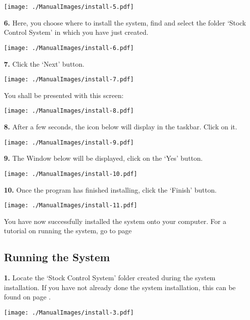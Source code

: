 \texttt{[image: ./ManualImages/install-5.pdf]}

\pagebreak

\textbf{6.} Here, you choose where to install the system, find and select the folder `Stock Control System' in which you have just created.

\texttt{[image: ./ManualImages/install-6.pdf]}

\pagebreak

\textbf{7.} Click the `Next' button.

\texttt{[image: ./ManualImages/install-7.pdf]}

\pagebreak

You shall be presented with this screen:

\texttt{[image: ./ManualImages/install-8.pdf]}

\pagebreak

\textbf{8.} After a few seconds, the icon below will display in the taskbar. Click on it.

\texttt{[image: ./ManualImages/install-9.pdf]}

\pagebreak

\textbf{9.} The Window below will be displayed, click on the `Yes' button.

\texttt{[image: ./ManualImages/install-10.pdf]}

\pagebreak

\textbf{10.} Once the program has finished installing, click the `Finish' button.

\texttt{[image: ./ManualImages/install-11.pdf]}

You have now successfully installed the system onto your computer. For a tutorial on running the system, go to page \pageref{fig:Running the System}

\pagebreak

\subsection{Running the System}
\label{fig:Running the System}

\textbf{1.} Locate the `Stock Control System' folder created during the system installation. If you have not already done the system installation, this can be found on page \pageref{fig:System Installation}.

\texttt{[image: ./ManualImages/install-3.pdf]}

